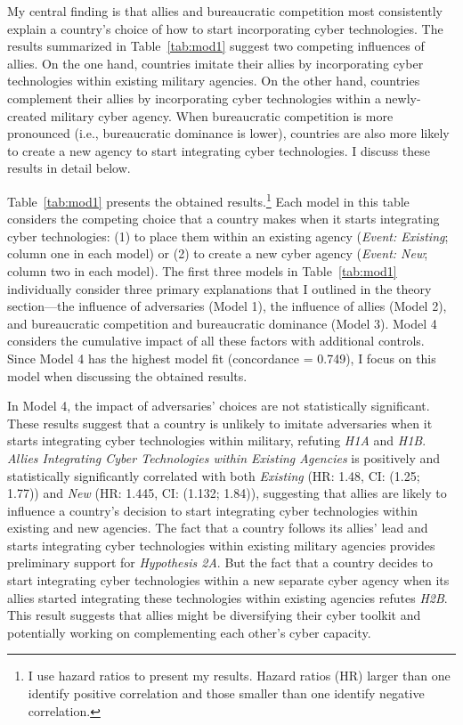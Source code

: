 \documentclass[12pt, letterpaper]{article}
\renewcommand{\baselinestretch}{1.35}
\let\oldfootnote\footnote
\renewcommand\footnote[1]{\oldfootnote{%
		\renewcommand\baselinestretch{.8}%
		\large\footnotesize\ignorespaces#1}} \addtolength{\footnotesep}{3pt}
\theoremstyle{plain}
\theoremstyle{remark}
\begin{document}
\noindent
My central finding is that allies and  bureaucratic competition most consistently explain a country's choice of how to start incorporating cyber technologies. 
The results summarized in Table~\ref{tab:mod1} suggest two competing influences of allies. 
On the one hand, countries imitate their allies by incorporating cyber technologies within existing military agencies. 
On the other hand, countries complement their allies by incorporating cyber technologies within a newly-created military cyber agency.
When bureaucratic competition is more pronounced (i.e., bureaucratic dominance is lower), countries are also more likely to create a new agency to start integrating cyber technologies.
I discuss these results in detail below. 


Table~\ref{tab:mod1} presents the obtained results.\footnote{
	I use hazard ratios to present my results. Hazard ratios (HR) larger than one identify positive correlation and those smaller than one identify negative correlation.
	} 
Each model in this table considers the competing choice that a country makes when it starts integrating cyber technologies: (1) to place them within an existing agency (\textit{Event: Existing}; column one in each model) or (2) to create a new cyber agency (\textit{Event: New}; column two in each model).
The first three models in Table~\ref{tab:mod1} individually consider three primary explanations that I outlined in the theory section---the influence of adversaries (Model 1), the influence of allies (Model 2), and bureaucratic competition and bureaucratic dominance (Model 3).
Model 4 considers the cumulative impact of all these factors with additional controls. 
Since Model 4 has the highest model fit (concordance = 0.749), I focus on this model when discussing the obtained results.


In Model 4, the impact of adversaries' choices are not statistically significant. 
These results suggest that a country is unlikely to imitate adversaries when it starts integrating cyber technologies within military, refuting \textit{H1A} and \textit{H1B}. 
\textit{Allies Integrating Cyber Technologies within Existing Agencies} is positively and statistically significantly correlated with both \textit{Existing} (HR: 1.48, CI: (1.25; 1.77)) and \textit{New} (HR: 1.445, CI: (1.132; 1.84)), suggesting that allies are likely to influence a country's decision to start integrating cyber technologies within existing and new agencies.  
The fact that a country follows its allies' lead and starts integrating cyber technologies within existing military agencies provides preliminary support for \textit{Hypothesis 2A}.
But the fact that a country decides to start integrating cyber technologies within a new separate cyber agency when its allies started integrating these technologies within existing agencies refutes \textit{H2B}. 
This result suggests that allies might be diversifying their cyber toolkit and potentially working on complementing each other's cyber capacity.
\end{document}

